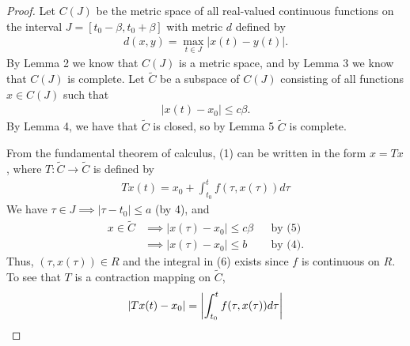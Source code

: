 \documentclass[10pt,a4paper]{article}
\theoremstyle{theorem}
\theoremstyle{definition}
\begin{document}
\begin{proof}
Let $C(J)$ be the metric space of all real-valued continuous functions on the interval $J = [t_0 - \beta, t_0 + \beta]$ with metric $d$ defined by 
\begin{align*}
d(x, y) = \max_{t \in J} |x(t) - y(t)|.
\end{align*}
By Lemma 2 we know that $C(J)$ is a metric space, and by Lemma 3 we know that $C(J)$ is complete.  Let $\tilde{C}$ be a subspace of $C(J)$ consisting of all functions $x \in C(J)$ such that 
\begin{align}
|x(t) - x_0| \leq c \beta.
\end{align}
By Lemma 4,  we have that $\tilde{C}$ is closed, so by Lemma 5 $\tilde{C}$ is complete.

From the fundamental theorem of calculus, (1) can be written in the form $x = Tx$, where $T: \tilde{C} \to \tilde{C}$ is defined by 
\begin{align}
Tx(t) = x_0 + \int_{t_0}^{t} f(\tau, x(\tau))d \tau
\end{align}
We have $\tau \in J \implies |\tau - t_0| \leq a$ (by 4), and 
\begin{align*}
x \in \tilde{C} &\implies |x(\tau) - x_0| \leq c \beta &&\text{by (5)}\\
&\implies |x(\tau) - x_0| \leq b &&\text{by (4)}.
\end{align*}
Thus, $(\tau, x(\tau)) \in R$ and the integral in (6) exists since $f$ is continuous on $R$. To see that $T$ is a contraction mapping on $\tilde{C}$,
\begin{align*}
|Tx(t) - x_0| = \left|\int_{t_0}^{t} f(\tau, x(\tau))d \tau \Large\right|
\end{align*}
\end{proof}
\end{document}
